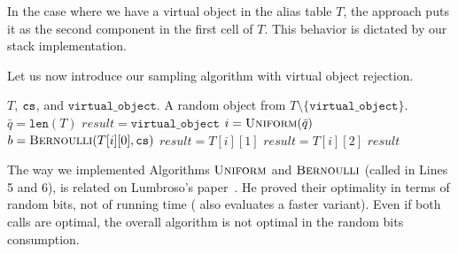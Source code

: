 
In the case where we have a virtual object in the alias table $T$,
the approach puts it as the second component in the first cell of $T$. This behavior is dictated by our stack implementation.



Let us now introduce our sampling algorithm with virtual object rejection.
\begin{algorithm}[htb]
\caption{Random sampling with virtual object rejection} 
\label{algo:tableXY}
	\begin{algorithmic}[1]
        \scriptsize
        \renewcommand{\algorithmicrequire}{\textbf{Input:}}
        \renewcommand{\algorithmicensure}{\textbf{Output:}}
        \Require $T$, $\texttt{cs}$, and $\texttt{virtual\_object}$.
        \Ensure A random object from $T \setminus \{\texttt{virtual\_object}\}$.
            \State $\bar{q} = \texttt{len}(T)$
            \State $result = \texttt{virtual\_object}$
                \State $i = \textsc{Uniform}(\bar{q})$
                \State $b = \textsc{Bernoulli}(T[i][0], \texttt{cs})$
                    \State $result = T[i][1]$
                \Else
                    \State $result = T[i][2]$
                \EndIf
            \EndWhile
            \State \Return $result$
        \EndFunction
    \end{algorithmic}
\end{algorithm}

The way we implemented Algorithms $\textsc{Uniform}$ and $\textsc{Bernoulli}$ (called in Lines 5 and 6),
is related on Lumbroso's paper~\cite{Lumbroso13}.
He proved their optimality in terms of random bits, not of running time ( also evaluates a faster variant).
Even if both calls are optimal, 
the overall algorithm is not optimal in the random bits consumption.

